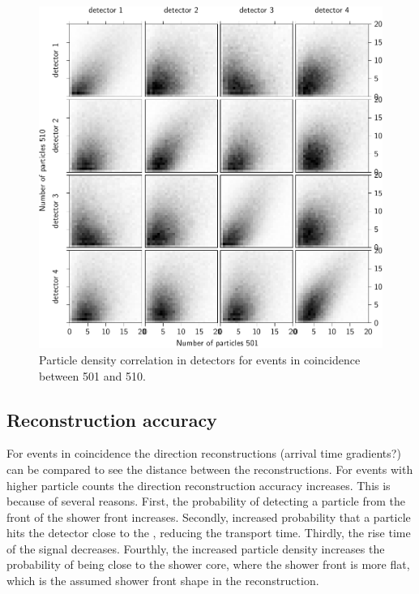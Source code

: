 \begin{figure}
    \centering
    \includegraphics{plots/station/n_minn16_501_510_bins}
    \caption{Particle density correlation in detectors for events in coincidence between 501 and 510.}
    \label{fig:density_501_510}
\end{figure}


\subsection{Reconstruction accuracy}

For events in coincidence the direction reconstructions (arrival time gradients?) can be compared to see the distance between the reconstructions. For events with higher particle counts the direction reconstruction accuracy increases. This is because of several reasons. First, the probability of detecting a particle from the front of the shower front increases. Secondly, increased probability that a particle hits the detector close to the \pmt, reducing the transport time. Thirdly, the rise time of the signal decreases. Fourthly, the increased particle density increases the probability of being close to the shower core, where the shower front is more flat, which is the assumed shower front shape in the reconstruction.

